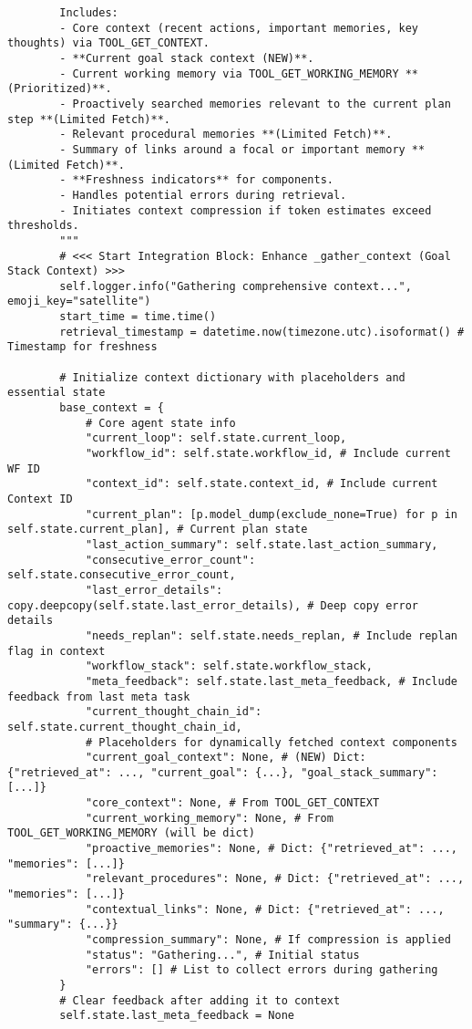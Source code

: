 \documentclass[12pt,a4paper]{article}
\begin{document}
\begin{pageablecode}
\begin{verbatim}
        Includes:
        - Core context (recent actions, important memories, key thoughts) via TOOL_GET_CONTEXT.
        - **Current goal stack context (NEW)**.
        - Current working memory via TOOL_GET_WORKING_MEMORY **(Prioritized)**.
        - Proactively searched memories relevant to the current plan step **(Limited Fetch)**.
        - Relevant procedural memories **(Limited Fetch)**.
        - Summary of links around a focal or important memory **(Limited Fetch)**.
        - **Freshness indicators** for components.
        - Handles potential errors during retrieval.
        - Initiates context compression if token estimates exceed thresholds.
        """
        # <<< Start Integration Block: Enhance _gather_context (Goal Stack Context) >>>
        self.logger.info("Gathering comprehensive context...", emoji_key="satellite")
        start_time = time.time()
        retrieval_timestamp = datetime.now(timezone.utc).isoformat() # Timestamp for freshness

        # Initialize context dictionary with placeholders and essential state
        base_context = {
            # Core agent state info
            "current_loop": self.state.current_loop,
            "workflow_id": self.state.workflow_id, # Include current WF ID
            "context_id": self.state.context_id, # Include current Context ID
            "current_plan": [p.model_dump(exclude_none=True) for p in self.state.current_plan], # Current plan state
            "last_action_summary": self.state.last_action_summary,
            "consecutive_error_count": self.state.consecutive_error_count,
            "last_error_details": copy.deepcopy(self.state.last_error_details), # Deep copy error details
            "needs_replan": self.state.needs_replan, # Include replan flag in context
            "workflow_stack": self.state.workflow_stack,
            "meta_feedback": self.state.last_meta_feedback, # Include feedback from last meta task
            "current_thought_chain_id": self.state.current_thought_chain_id,
            # Placeholders for dynamically fetched context components
            "current_goal_context": None, # (NEW) Dict: {"retrieved_at": ..., "current_goal": {...}, "goal_stack_summary": [...]}
            "core_context": None, # From TOOL_GET_CONTEXT
            "current_working_memory": None, # From TOOL_GET_WORKING_MEMORY (will be dict)
            "proactive_memories": None, # Dict: {"retrieved_at": ..., "memories": [...]}
            "relevant_procedures": None, # Dict: {"retrieved_at": ..., "memories": [...]}
            "contextual_links": None, # Dict: {"retrieved_at": ..., "summary": {...}}
            "compression_summary": None, # If compression is applied
            "status": "Gathering...", # Initial status
            "errors": [] # List to collect errors during gathering
        }
        # Clear feedback after adding it to context
        self.state.last_meta_feedback = None


\end{verbatim}
\end{pageablecode}
\end{document}
